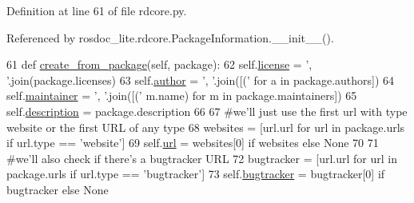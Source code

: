 Definition at line 61 of file rdcore.\+py.



Referenced by rosdoc\+\_\+lite.\+rdcore.\+Package\+Information.\+\_\+\+\_\+init\+\_\+\+\_\+().


\begin{DoxyCode}
61     \textcolor{keyword}{def }\hyperlink{classrosdoc__lite_1_1rdcore_1_1PackageInformation_a2349efef3941fbc9e024588a769ba5a1}{create\_from\_package}(self, package):
62         self.\hyperlink{classrosdoc__lite_1_1rdcore_1_1PackageInformation_a64ff5843063bf71f16f4cdab4d1bbd18}{license} = \textcolor{stringliteral}{', '}.join(package.licenses)
63         self.\hyperlink{classrosdoc__lite_1_1rdcore_1_1PackageInformation_a5c27cda0ae2ab8203fb74d3d5e8d0ed2}{author} =  \textcolor{stringliteral}{', '}.join([(\textcolor{stringliteral}{'%
      for} a \textcolor{keywordflow}{in} package.authors])
64         self.\hyperlink{classrosdoc__lite_1_1rdcore_1_1PackageInformation_a1972daa7cde3c680c98bb054eda418a5}{maintainer} =  \textcolor{stringliteral}{', '}.join([(\textcolor{stringliteral}{'%
      m.name) \textcolor{keywordflow}{for} m \textcolor{keywordflow}{in} package.maintainers])
65         self.\hyperlink{classrosdoc__lite_1_1rdcore_1_1PackageInformation_a579d2604f2cfac815e8e3072c0833360}{description} = package.description
66 
67         \textcolor{comment}{#we'll just use the first url with type website or the first URL of any type}
68         websites = [url.url \textcolor{keywordflow}{for} url \textcolor{keywordflow}{in} package.urls \textcolor{keywordflow}{if} url.type == \textcolor{stringliteral}{'website'}]
69         self.\hyperlink{classrosdoc__lite_1_1rdcore_1_1PackageInformation_a0ef2dba844b386398740004bc74d1bce}{url} = websites[0] \textcolor{keywordflow}{if} websites \textcolor{keywordflow}{else} \textcolor{keywordtype}{None}
70 
71         \textcolor{comment}{#we'll also check if there's a bugtracker URL}
72         bugtracker = [url.url \textcolor{keywordflow}{for} url \textcolor{keywordflow}{in} package.urls \textcolor{keywordflow}{if} url.type == \textcolor{stringliteral}{'bugtracker'}]
73         self.\hyperlink{classrosdoc__lite_1_1rdcore_1_1PackageInformation_a587611359b64f8680f3dc88110406e38}{bugtracker} = bugtracker[0] \textcolor{keywordflow}{if} bugtracker \textcolor{keywordflow}{else} \textcolor{keywordtype}{None}
}
\end{DoxyCode}
